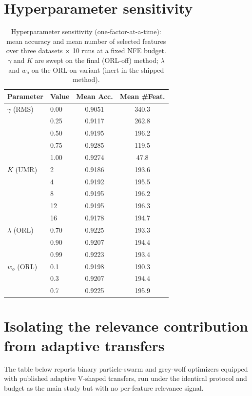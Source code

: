 \documentclass[9pt]{article}
\begin{document}
\section{Hyperparameter sensitivity}
\begin{table}[t]
\centering
\caption{Hyperparameter sensitivity (one-factor-at-a-time): mean accuracy and mean number of selected features over three datasets $\times$ 10 runs at a fixed NFE budget. $\gamma$ and $K$ are swept on the final (ORL-off) method; $\lambda$ and $w_o$ on the ORL-on variant (inert in the shipped method).}
\label{tab:sensitivity}
\footnotesize
\begin{tabular}{llcc}
\toprule
Parameter & Value & Mean Acc. & Mean \#Feat. \\
\midrule
$\gamma$ (RMS) & 0.00 & 0.9051 & 340.3 \\
 & 0.25 & 0.9117 & 262.8 \\
 & 0.50 & 0.9195 & 196.2 \\
 & 0.75 & 0.9285 & 119.5 \\
 & 1.00 & 0.9274 & 47.8 \\
\addlinespace
$K$ (UMR) & 2 & 0.9186 & 193.6 \\
 & 4 & 0.9192 & 195.5 \\
 & 8 & 0.9195 & 196.2 \\
 & 12 & 0.9195 & 196.3 \\
 & 16 & 0.9178 & 194.7 \\
\addlinespace
$\lambda$ (ORL) & 0.70 & 0.9225 & 193.3 \\
 & 0.90 & 0.9207 & 194.4 \\
 & 0.99 & 0.9223 & 193.4 \\
\addlinespace
$w_o$ (ORL) & 0.1 & 0.9198 & 190.3 \\
 & 0.3 & 0.9207 & 194.4 \\
 & 0.7 & 0.9225 & 195.9 \\
\bottomrule
\end{tabular}
\end{table}


\FloatBarrier
\section{Isolating the relevance contribution from adaptive transfers}
The table below reports binary particle-swarm and grey-wolf optimizers
equipped with published adaptive V-shaped transfers, run under the identical
protocol and budget as the main study but with no per-feature relevance
signal.
\end{document}
